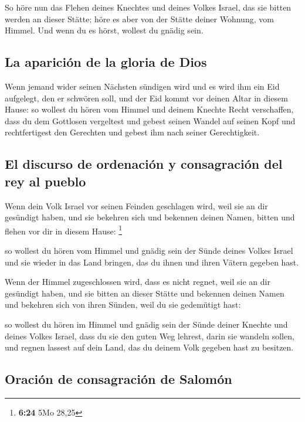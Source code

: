  So höre nun das Flehen deines Knechtes und deines Volkes
Israel, das sie bitten werden an dieser Stätte; höre es aber von der
Stätte deiner Wohnung, vom Himmel. Und wenn du es hörst, wollest du
gnädig sein.

\hypertarget{la-apariciuxf3n-de-la-gloria-de-dios}{%
\subsection{La aparición de la gloria de
Dios}\label{la-apariciuxf3n-de-la-gloria-de-dios}}

 Wenn jemand wider seinen Nächsten sündigen wird und es
wird ihm ein Eid aufgelegt, den er schwören soll, und der Eid kommt vor
deinen Altar in diesem Hause:  so wollest du hören vom
Himmel und deinem Knechte Recht verschaffen, dass du dem Gottlosen
vergeltest und gebest seinen Wandel auf seinen Kopf und rechtfertigest
den Gerechten und gebest ihm nach seiner Gerechtigkeit.

\hypertarget{el-discurso-de-ordenaciuxf3n-y-consagraciuxf3n-del-rey-al-pueblo}{%
\subsection{El discurso de ordenación y consagración del rey al
pueblo}\label{el-discurso-de-ordenaciuxf3n-y-consagraciuxf3n-del-rey-al-pueblo}}

 Wenn dein Volk Israel vor seinen Feinden geschlagen
wird, weil sie an dir gesündigt haben, und sie bekehren sich und
bekennen deinen Namen, bitten und flehen vor dir in diesem Hause:
\footnote{\textbf{6:24} 5Mo 28,25}

 so wollest du hören vom Himmel und gnädig sein der Sünde
deines Volkes Israel und sie wieder in das Land bringen, das du ihnen
und ihren Vätern gegeben hast.

 Wenn der Himmel zugeschlossen wird, dass es nicht
regnet, weil sie an dir gesündigt haben, und sie bitten an dieser Stätte
und bekennen deinen Namen und bekehren sich von ihren Sünden, weil du
sie gedemütigt hast:

 so wollest du hören im Himmel und gnädig sein der Sünde
deiner Knechte und deines Volkes Israel, dass du sie den guten Weg
lehrest, darin sie wandeln sollen, und regnen lassest auf dein Land, das
du deinem Volk gegeben hast zu besitzen.

\hypertarget{oraciuxf3n-de-consagraciuxf3n-de-salomuxf3n}{%
\subsection{Oración de consagración de
Salomón}\label{oraciuxf3n-de-consagraciuxf3n-de-salomuxf3n}}

